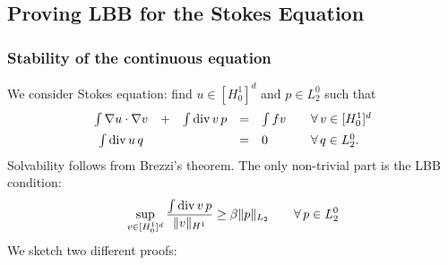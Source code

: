 








% 

\subsection{Proving LBB for the Stokes Equation}
\subsubsection{Stability of the continuous equation}

We consider Stokes equation: find $u \in [H_0^1]^d$ and $p \in L_2^0$ such that
\begin{equation}
\begin{array}{ccccll}
\int \nabla u \cdot \nabla v & + & \int \operatorname{div} v \, p & = & \int f v \quad & \forall \, v \in [H_0^1]^d \\[0.5em]
\int \operatorname{div} u \, q && & = & 0 & \forall \, q \in L_2^0.
\end{array}
\end{equation}
Solvability follows from Brezzi's theorem. The only non-trivial part is the LBB condition:
$$
\sup_{v \in [H_0^1]^d} \frac { \int \operatorname{div} v \, p}  { \| v \|_{H^1}} \geq \beta \| p \|_{L_2}
\qquad \forall \, p \in L_2^0
$$ 
We sketch two different proofs: 

